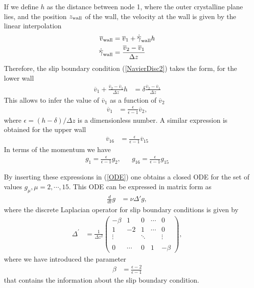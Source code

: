 \documentclass[b5paper,openright,10pt]{book}
\begin{document}
If  we define  $h$ as  the distance  between node  1, where  the outer
crystalline plane  lies, and the  position $z_{\rm wall}$ of  the wall,
the velocity at the wall is given by the linear interpolation
\begin{align}
  {\overline{v}}_{\rm wall}&= \overline{v}_1+\dot{{\overline{\gamma}}}_{\rm wall} h
\nonumber\\
\dot{{\overline{\gamma}}}_{\rm wall}&=\frac{\overline{v}_2-\overline{v}_1}{\Delta z}
\end{align}
Therefore, the  slip boundary condition (\ref{NavierDisc2})  takes the
form, for the lower wall
\begin{align}
  \overline{v}_1+\frac{\overline{v}_2-\overline{v}_1}{\Delta z} h&=\delta \frac{\overline{v}_2-\overline{v}_1}{\Delta z}
\end{align}
This allows to infer the value of $\overline{v}_1$ as a function of $\overline{v}_2$ 
\begin{align}
  \overline{v}_1&=\frac{\epsilon}{\epsilon-1}\overline{v}_2,
\end{align}
where $\epsilon=(h-\delta)/\Delta z$ is a dimensionless number.
A similar expression is obtained for the upper wall
\begin{align}
  \overline{v}_{16}&=\frac{\epsilon}{\epsilon-1}\overline{v}_{15}
\end{align}
In terms of the momentum we have
\begin{align}
  g_1=\frac{\epsilon}{\epsilon-1}g_2, &&
  g_{16}=\frac{\epsilon}{\epsilon-1}g_{15}
\end{align}

By inserting these expressions in (\ref{ODE}) one obtains a closed
ODE for the set of values ${g}_\mu,\mu=2,\cdots,15$. This
ODE can be expressed in matrix form as
\begin{align}
  \frac{d}{dt}{g}&=\nu \Delta' {g},
\label{closedODE}
\end{align}
where the discrete Laplacian operator  for slip boundary conditions is
given by
\begin{align}
\Delta^\prime&
=\frac{1}{\Delta z^2}\left(
    \begin{array}{crrrc}
-\beta &1&0&\cdots&0\\
1&-2&1&\cdots&0\\
\vdots      &&\ddots&&\vdots\\
\\
0&\cdots&0&1&-\beta \end{array}
\right),
\end{align}
where we have introduced the parameter
\begin{align}
\beta&=  \frac{\epsilon-2}{\epsilon-1}
\end{align}
that contains  the information about  the slip boundary  condition.
\end{document}
